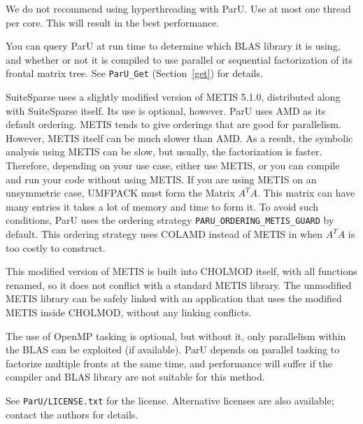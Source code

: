 \documentclass[12pt]{article}
\begin{document}
We do not recommend using hyperthreading with ParU.
Use at most one thread per core.  This will result in
the best performance.

You can query ParU at run time to determine which BLAS library it is using, and
whether or not it is compiled to use parallel or sequential factorization of
its frontal matrix tree.  See \verb'ParU_Get' (Section~\ref{get}) for details.

SuiteSparse uses a slightly modified version of METIS 5.1.0, distributed along
with SuiteSparse itself.  Its use is optional, however. ParU uses AMD as its
default ordering. METIS tends to give orderings that are good for parallelism.
However, METIS itself can be much slower than AMD. As a result, the symbolic
analysis using METIS can be slow, but usually, the factorization is faster.
Therefore, depending on your use case, either use METIS, or you can compile and
run your code without using METIS.  If you are using METIS on an unsymmetric
case, UMFPACK must form the Matrix $A^{T}A$. This matrix can have many entries
it takes a lot of memory and time to form it. To avoid such conditions, ParU
uses the ordering strategy \verb'PARU_ORDERING_METIS_GUARD' by default.  This
ordering strategy uses COLAMD instead of METIS in when $A^T A$ is too costly to
construct.

This modified version of METIS is built into CHOLMOD itself, with all
functions renamed, so it does not conflict with a standard METIS library.
The unmodified METIS library can be safely linked with an application that
uses the modified METIS inside CHOLMOD, without any linking conflicts.

The use of OpenMP tasking is optional, but without it, only parallelism within
the BLAS can be exploited (if available).  ParU depends on parallel tasking to
factorize multiple fronts at the same time, and performance will suffer if the
compiler and BLAS library are not suitable for this method.

See \verb'ParU/LICENSE.txt' for the license.  Alternative licenses are also
available; contact the authors for details.




\end{document}
